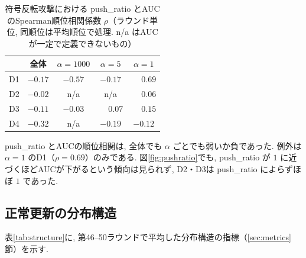 \documentclass[a4j, twocolumn, dvipdfmx]{jsarticle}
\newcommand{\PushRatio}{\textrm{push\_ratio}}
\begin{document}
\begin{table}[t]
\centering
\caption{符号反転攻撃における \PushRatio{} とAUCのSpearman順位相関係数 $\rho$（ラウンド単位, 同順位は平均順位で処理. n/a はAUCが一定で定義できないもの）}
\label{tab:corr}
\begin{tabular}{@{}lcccc@{}}
\toprule
 & 全体 & $\alpha=1000$ & $\alpha=5$ & $\alpha=1$ \\
\midrule
D1 & $-0.17$ & $-0.57$ & $-0.17$ & $\phantom{-}0.69$ \\
D2 & $-0.02$ & n/a & n/a & $\phantom{-}0.06$ \\
D3 & $-0.11$ & $-0.03$ & $\phantom{-}0.07$ & $\phantom{-}0.15$ \\
D4 & $-0.32$ & n/a & $-0.19$ & $-0.12$ \\
\bottomrule
\end{tabular}
\end{table}

\PushRatio{} とAUCの順位相関は, 全体でも $\alpha$ ごとでも弱いか負であった. 例外は $\alpha=1$ のD1（$\rho=0.69$）のみである. 図\ref{fig:pushratio}でも, \PushRatio{} が $1$ に近づくほどAUCが下がるという傾向は見られず, D2・D3は \PushRatio{} によらずほぼ $1$ であった.

\subsection{正常更新の分布構造}
\label{sec:res-structure}

表\ref{tab:structure}に, 第46--50ラウンドで平均した分布構造の指標（\ref{sec:metrics}節）を示す.
\end{document}

